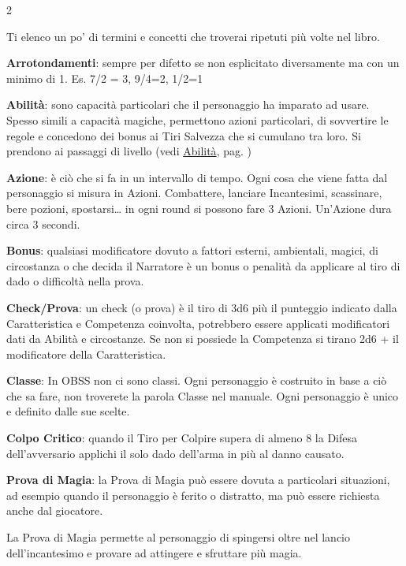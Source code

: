 \begin{multicols}{2}

Ti elenco un po' di termini e concetti che troverai ripetuti più volte nel libro.

\medskip

\textbf{Arrotondamenti}: sempre per difetto se non esplicitato diversamente ma con un minimo di 1. Es. 7/2 = 3, 9/4=2, 1/2=1

\textbf{Abilità}: sono capacità particolari che il personaggio ha imparato ad usare. Spesso simili a capacità magiche, permettono azioni particolari, di sovvertire le regole e concedono dei bonus ai Tiri Salvezza che si cumulano tra loro. Si prendono ai passaggi di livello (vedi \hyperlink{abilita}{Abilità}, pag. \pageref{abilita})

\textbf{Azione}:  è ciò che si fa in un intervallo di tempo. Ogni cosa che viene fatta dal personaggio si misura in Azioni. Combattere, lanciare Incantesimi, scassinare, bere pozioni, spostarsi… in ogni round si possono fare 3 Azioni. Un'Azione dura circa 3 secondi.

\textbf{Bonus}: qualsiasi modificatore dovuto a fattori esterni, ambientali, magici, di circostanza o che decida il Narratore è un bonus o penalità da applicare al tiro di dado o difficoltà nella prova.

\textbf{Check/Prova}: un check (o prova) è il tiro di 3d6 più il punteggio indicato dalla Caratteristica e Competenza coinvolta, potrebbero essere applicati modificatori dati da Abilità e circostanze. Se non si possiede la Competenza si tirano 2d6 + il modificatore della Caratteristica.

\textbf{Classe}: In OBSS non ci sono classi. Ogni personaggio è costruito in base a ciò che sa fare, non troverete la parola Classe nel manuale. Ogni personaggio è unico e definito dalle sue scelte.

\textbf{Colpo Critico}: quando il Tiro per Colpire supera di almeno 8 la Difesa dell'avversario applichi il solo dado dell'arma in più al danno causato.

\textbf{Prova di Magia}: la Prova di Magia può essere dovuta a particolari situazioni, ad esempio quando il personaggio è ferito o distratto, ma può essere richiesta anche dal giocatore.

La Prova di Magia permette al personaggio di spingersi oltre nel lancio dell'incantesimo e provare ad attingere e sfruttare più magia.


\end{multicols}
